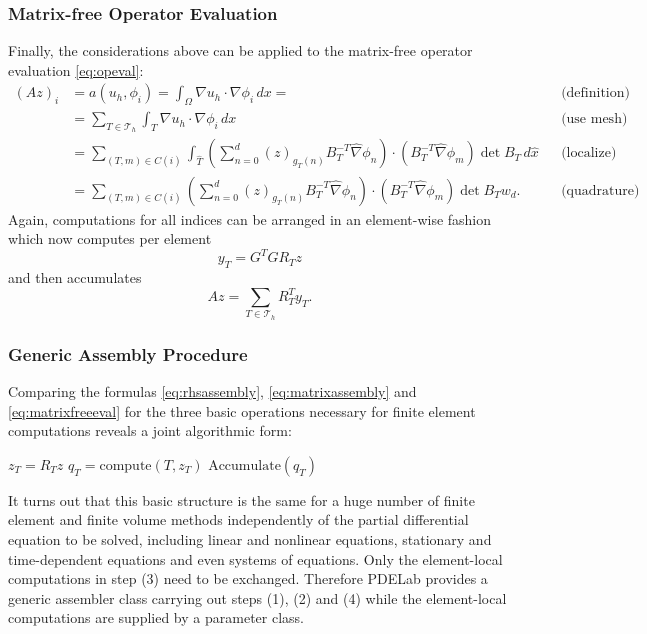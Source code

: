 \documentclass[a4paper,12pt]{article}
\begin{document}
\subsubsection*{Matrix-free Operator Evaluation}

Finally, the considerations above can be applied to the matrix-free operator
evaluation \eqref{eq:opeval}:
\begin{align*}
(Az)_i  &= a(u_h,\phi_i) =  \int_\Omega \nabla u_h \cdot \nabla \phi_i \,dx =
&&\text{(definition)} \\ 
&= \sum_{T\in\mathcal{T}_h} \int_T \nabla u_h \cdot \nabla \phi_i \,dx
&&\text{(use mesh)}\\
&= \sum_{(T,m)\in C(i)}
\int_{\hat T} 
\left(\sum_{n=0}^d (z)_{g_T(n)} B_T^{-T} \hat\nabla\phi_n\right)
\cdot (B_T^{-T} \hat\nabla\phi_m) \det B_T \,d\hat x &&\text{(localize)}\\
&= \sum_{(T,m)\in C(i)}
\left(\sum_{n=0}^d (z)_{g_T(n)} B_T^{-T} \hat\nabla\phi_n\right)
\cdot (B_T^{-T} \hat\nabla\phi_m) \det B_T w_d . &&\text{(quadrature)}
\end{align*}
Again, computations for all indices can be arranged in an element-wise fashion
which now computes per element
\begin{equation}
y_T = G^T G R_T z
\label{eq:alpha_volume}
\end{equation}
and then accumulates
\begin{equation}
Az =  \sum_{T\in\mathcal{T}_h} R_T^T y_T.
\label{eq:matrixfreeeval}
\end{equation}

\subsubsection*{Generic Assembly Procedure}

Comparing the formulas \eqref{eq:rhsassembly}, \eqref{eq:matrixassembly}
and \eqref{eq:matrixfreeeval} for the three basic operations necessary for
finite element computations reveals a joint algorithmic form:
\begin{algorithmic}[1]
 
\State $z_T = R_T z$ 
\State $q_T=\text{compute}(T,z_T)$ 
\State $\text{Accumulate}(q_T)$ 
\EndFor
\end{algorithmic}

It turns out that this basic structure is the same for a huge number
of  finite element and finite volume methods independently of
the partial differential equation to be solved, including linear
and nonlinear equations, stationary and time-dependent equations
and even systems of equations. Only the element-local
computations in step (3) need to be exchanged. Therefore PDELab
provides a generic assembler class carrying out steps (1), (2) and (4)
while the element-local computations are supplied by a parameter class.
\end{document}
